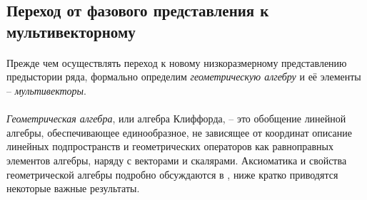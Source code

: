 \documentclass[12pt]{article}
\begin{document}
\newpage
\subsection{Переход от фазового представления к мультивекторному}\label{GA}
\paragraph{} Прежде чем осуществлять переход к новому низкоразмерному представлению предыстории ряда, формально определим \textit{геометрическую алгебру} и её элементы -- \textit{мультивекторы}.
\paragraph{}
\textit{Геометрическая алгебра}, или алгебра Клиффорда, -- это обобщение линейной алгебры, обеспечивающее единообразное, не зависящее от координат описание линейных подпространств и геометрических операторов как равноправных элементов алгебры, наряду с векторами и скалярами. Аксиоматика и свойства геометрической алгебры подробно обсуждаются в \cite{Eric, Dorst2007GeometricAF}, ниже кратко приводятся некоторые важные результаты.
\end{document}
